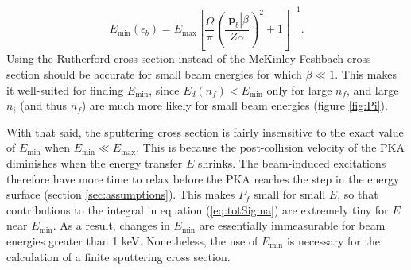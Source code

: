 \documentclass{article}
\begin{document}
\begin{equation}
  E_\text{min}(\epsilon_b)
  =
  E_\text{max}
  \left[\frac{\Omega}{\pi}
    \left(\frac{|\mathbf{p}_b|\beta}{Z\alpha}\right)^2 + 1
  \right]^{-1}.
  \label{eq:Emin}
\end{equation}
%
Using the Rutherford cross section instead of the McKinley-Feshbach cross
section should be accurate for small beam energies for which $\beta\ll 1$.
This makes it well-suited for finding $E_\text{min}$, since
$E_d(n_f)<E_\text{min}$ only for large $n_f$, and large $n_i$ (and thus $n_f$)
are much more likely for small beam energies (figure \ref{fig:Pi}).

With that said, the sputtering cross section is fairly insensitive to the exact
value of $E_\text{min}$ when $E_\text{min} \ll E_\text{max}$.
This is because the post-collision velocity of the PKA diminishes when the
energy transfer $E$ shrinks.
The beam-induced excitations therefore have more time to relax before the PKA
reaches the step in the energy surface (section \ref{sec:assumptions}).
This makes $P_f$ small for small $E$, so that contributions to the integral in
equation (\ref{eq:totSigma}) are extremely tiny for $E$ near $E_\text{min}$.
As a result, changes in $E_\text{min}$ are essentially immeasurable for beam
energies greater than 1 keV.
Nonetheless, the use of $E_\text{min}$ is necessary for the calculation of a
finite sputtering cross section.



\end{document}
